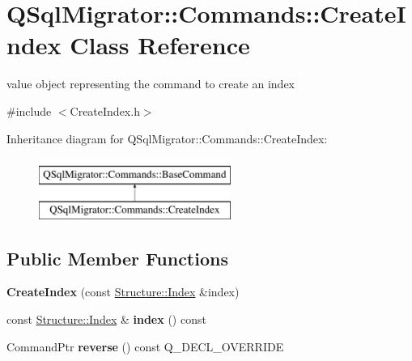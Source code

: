 \hypertarget{class_q_sql_migrator_1_1_commands_1_1_create_index}{}\section{Q\+Sql\+Migrator\+:\+:Commands\+:\+:Create\+Index Class Reference}
\label{class_q_sql_migrator_1_1_commands_1_1_create_index}


value object representing the command to create an index  




{\ttfamily \#include $<$Create\+Index.\+h$>$}

Inheritance diagram for Q\+Sql\+Migrator\+:\+:Commands\+:\+:Create\+Index\+:\begin{figure}[H]
\begin{center}
\leavevmode
\includegraphics[height=2.000000cm]{class_q_sql_migrator_1_1_commands_1_1_create_index}
\end{center}
\end{figure}
\subsection*{Public Member Functions}
\begin{DoxyCompactItemize}
\item 
\mbox{\label{class_q_sql_migrator_1_1_commands_1_1_create_index_abb648a593ac6fb23957eaf049b512401}} 
{\bfseries Create\+Index} (const \hyperlink{class_q_sql_migrator_1_1_structure_1_1_index}{Structure\+::\+Index} \&index)
\item 
\mbox{\label{class_q_sql_migrator_1_1_commands_1_1_create_index_a940f33d3b38dbe3ab5885a38beba9342}} 
const \hyperlink{class_q_sql_migrator_1_1_structure_1_1_index}{Structure\+::\+Index} \& {\bfseries index} () const
\item 
\mbox{\label{class_q_sql_migrator_1_1_commands_1_1_create_index_a392c63c9a5af4864ee2ca62e4db36e3d}} 
Command\+Ptr {\bfseries reverse} () const Q\+\_\+\+D\+E\+C\+L\+\_\+\+O\+V\+E\+R\+R\+I\+DE
\end{DoxyCompactItemize}
